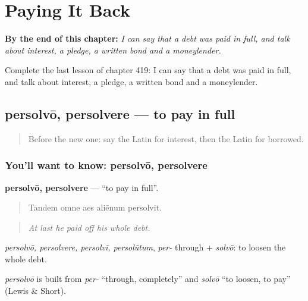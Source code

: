 
\chapter{Paying It Back}
\label{ch:la-paying-it-back}

\begin{chapteropening}
\textbf{By the end of this chapter:} \emph{I can say that a debt was paid in full, and talk about interest, a pledge, a written bond and a moneylender.}

Complete the last lesson of chapter 419: I can say that a debt was paid in full, and talk about interest, a pledge, a written bond and a moneylender.
\end{chapteropening}

\section[persolvō, persolvere]{persolvō, persolvere — to pay in full}

\label{lesson:LA-C419-persolvo}



\begin{quote}
Before the new one: say the Latin for interest, then the Latin for borrowed.
\end{quote}

\subsection*{You'll want to know: persolvō, persolvere}
\textbf{persolvō, persolvere} — \textquotedblleft{}to pay in full\textquotedblright{}.

\begin{quote}
Tandem omne aes aliēnum persolvit.
\end{quote}

\begin{quote}
\emph{At last he paid off his whole debt.}
\end{quote}

\emph{persolvō, persolvere, persolvī, persolūtum}, \emph{per-} through + \emph{solvō}: to loosen the whole debt.

\begin{cousinweb}
\emph{persolvō} is built from \emph{per-} \textquotedblleft{}through, completely\textquotedblright{} and \emph{solvō} \textquotedblleft{}to loosen, to pay\textquotedblright{} (Lewis \& Short).
\end{cousinweb}

